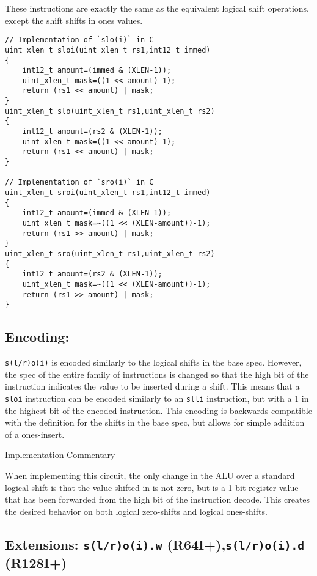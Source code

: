 These instructions are exactly the same as the equivalent logical shift
operations, except the shift shifts in ones values.

\begin{verbatim}
// Implementation of `slo(i)` in C
uint_xlen_t sloi(uint_xlen_t rs1,int12_t immed)
{
    int12_t amount=(immed & (XLEN-1));
    uint_xlen_t mask=((1 << amount)-1);
    return (rs1 << amount) | mask;
}
uint_xlen_t slo(uint_xlen_t rs1,uint_xlen_t rs2)
{
    int12_t amount=(rs2 & (XLEN-1));
    uint_xlen_t mask=((1 << amount)-1);
    return (rs1 << amount) | mask;
}

// Implementation of `sro(i)` in C
uint_xlen_t sroi(uint_xlen_t rs1,int12_t immed)
{
    int12_t amount=(immed & (XLEN-1));
    uint_xlen_t mask=~((1 << (XLEN-amount))-1);
    return (rs1 >> amount) | mask;
}
uint_xlen_t sro(uint_xlen_t rs1,uint_xlen_t rs2)
{
    int12_t amount=(rs2 & (XLEN-1));
    uint_xlen_t mask=~((1 << (XLEN-amount))-1);
    return (rs1 >> amount) | mask;
}
\end{verbatim}

\subsection{Encoding:}\label{encoding-3}



\texttt{s(l/r)o(i)} is encoded similarly to the logical shifts in the
base spec. However, the spec of the entire family of instructions is
changed so that the high bit of the instruction indicates the value to
be inserted during a shift. This means that a \texttt{sloi} instruction
can be encoded similarly to an \texttt{slli} instruction, but with a 1
in the highest bit of the encoded instruction. This encoding is
backwards compatible with the definition for the shifts in the base
spec, but allows for simple addition of a ones-insert.

Implementation Commentary

When implementing this circuit, the only change in the ALU over a
standard logical shift is that the value shifted in is not zero, but is
a 1-bit register value that has been forwarded from the high bit of the
instruction decode. This creates the desired behavior on both logical
zero-shifts and logical ones-shifts.

\subsection{\texorpdfstring{Extensions: \texttt{s(l/r)o(i).w}
(R64I+),\texttt{s(l/r)o(i).d}
(R128I+)}{Extensions: s(l/r)o(i).w (R64I+),s(l/r)o(i).d (R128I+)}}\label{extensions-slroi.w-r64islroi.d-r128i}

